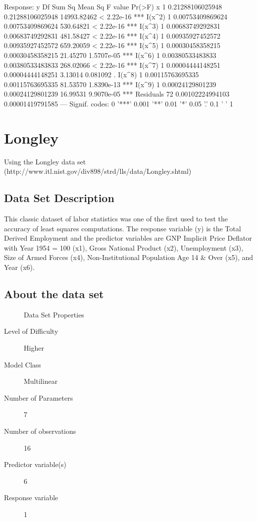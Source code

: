 \documentclass[10pt]{article}
\begin{document}
\begin{Schunk}
\begin{Soutput}
Response: y
          Df           Sum Sq          Mean Sq     F value     Pr(>F)    
x          1 0.21288106025948 0.21288106025948 14993.82462 < 2.22e-16 ***
I(x^2)     1 0.00753409869624 0.00753409869624   530.64821 < 2.22e-16 ***
I(x^3)     1 0.00683749292831 0.00683749292831   481.58427 < 2.22e-16 ***
I(x^4)     1 0.00935927452572 0.00935927452572   659.20059 < 2.22e-16 ***
I(x^5)     1 0.00030458358215 0.00030458358215    21.45270 1.5707e-05 ***
I(x^6)     1 0.00380533483833 0.00380533483833   268.02066 < 2.22e-16 ***
I(x^7)     1 0.00004444148251 0.00004444148251     3.13014   0.081092 .  
I(x^8)     1 0.00115763695335 0.00115763695335    81.53570 1.8390e-13 ***
I(x^9)     1 0.00024129801239 0.00024129801239    16.99531 9.9070e-05 ***
Residuals 72 0.00102224994103 0.00001419791585                           
---
Signif. codes:  0 '***' 0.001 '**' 0.01 '*' 0.05 '.' 0.1 ' ' 1
\end{Soutput}
\end{Schunk}



\section{Longley}
Using the Longley data set (http://www.itl.nist.gov/div898/strd/lls/data/Longley.shtml)

\subsection*{Data Set Description}
This classic dataset of labor statistics was one of the first used to test the 
accuracy of least squares computations. The response variable (y) is the 
Total Derived Employment and the predictor variables are GNP Implicit Price Deflator 
with Year 1954 = 100 (x1), Gross National Product (x2), Unemployment (x3), 
Size of Armed Forces (x4), Non-Institutional Population Age 14 \& Over (x5), 
and Year (x6).


\subsection*{About the data set}

\begin{description}
   \item[]Data Set Properties
   \item[Level of Difficulty] Higher
   \item[Model Class] Multilinear
   \item[Number of Parameters] 7
   \item[Number of observations] 16
   \item[Predictor variable(s)] 6
   \item[Response variable] 1
\end{description}
\end{document}
